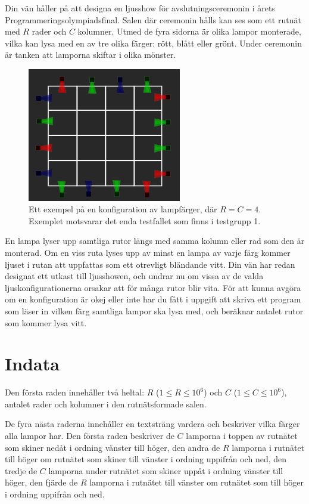 Din vän håller på att designa en ljusshow för avslutningsceremonin i årets Programmeringsolympiadsfinal.
Salen där ceremonin hålls kan ses som ett rutnät med $R$ rader och $C$ kolumner.
Utmed de fyra sidorna är olika lampor monterade, vilka kan lysa med en av tre olika färger: rött, blått eller grönt.
Under ceremonin är tanken att lamporna skiftar i olika mönster.

\begin{figure}[h]
    \centering
    \includegraphics[width=0.6\textwidth]{affischbild}
    \caption{Ett exempel på en konfiguration av lampfärger, där $R = C = 4$. Exemplet motsvarar det enda testfallet som finns i testgrupp 1.}
\end{figure}

En lampa lyser upp samtliga rutor längs med samma kolumn eller rad som den är monterad.
Om en viss ruta lyses upp av minst en lampa av varje färg kommer ljuset i rutan att uppfattas som ett otrevligt bländande vitt.
Din vän har redan designat ett utkast till ljusshowen, och undrar nu om vissa av de valda ljuskonfigurationerna orsakar att för många rutor blir vita.
För att kunna avgöra om en konfiguration är okej eller inte har du fått i uppgift att skriva ett program som läser in vilken färg samtliga lampor ska lysa med, och beräknar antalet rutor som kommer lysa vitt.

\section*{Indata}
Den första raden innehåller två heltal: $R$ ($1 \le R \le 10^6$) och $C$ ($1 \le C \le 10^6$), antalet rader och kolumner i den rutnätsformade salen.

De fyra nästa raderna innehåller en textsträng vardera och beskriver vilka färger alla lampor har.
Den första raden beskriver de $C$ lamporna i toppen av rutnätet som skiner nedåt i ordning vänster till höger,
    den andra de $R$ lamporna i rutnätet till höger om rutnätet som skiner till vänster i ordning uppifrån och ned,
    den tredje de $C$ lamporna under rutnätet som skiner uppåt i ordning vänster till höger,
    den fjärde de $R$ lamporna i rutnätet till vänster om rutnätet som till höger i ordning uppifrån och ned.

